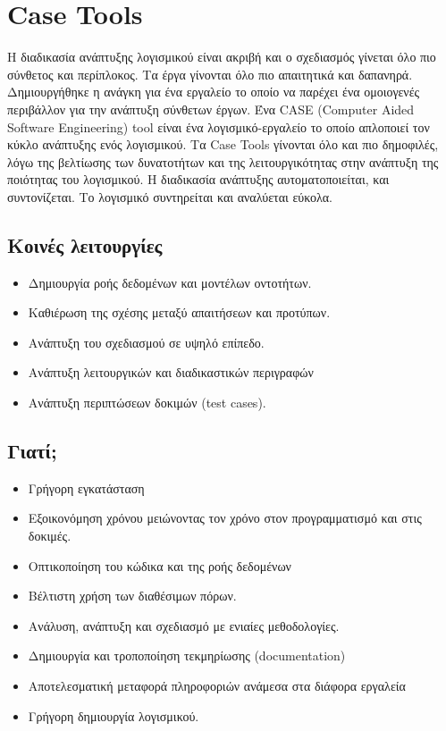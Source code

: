 \section{Case Tools}
Η διαδικασία ανάπτυξης λογισμικού είναι ακριβή και ο σχεδιασμός γίνεται όλο πιο σύνθετος και περίπλοκος. Τα έργα γίνονται όλο πιο απαιτητικά και δαπανηρά. Δημιουργήθηκε η ανάγκη για ένα εργαλείο το οποίο να παρέχει ένα ομοιογενές περιβάλλον για την ανάπτυξη σύνθετων έργων. 
Ένα CASE (Computer Aided Software Engineering) tool είναι ένα λογισμικό-εργαλείο το οποίο απλοποιεί τον κύκλο ανάπτυξης ενός λογισμικού. Τα Case Tools γίνονται όλο και πιο δημοφιλές, λόγω της βελτίωσης των δυνατοτήτων και της λειτουργικότητας στην ανάπτυξη της ποιότητας του λογισμικού. Η διαδικασία ανάπτυξης αυτοματοποιείται, και συντονίζεται. Το λογισμικό συντηρείται και αναλύεται εύκολα. 

\subsection{Kοινές λειτουργίες}
\begin{itemize}
	\item Δημιουργία ροής δεδομένων και μοντέλων οντοτήτων.
	\item Καθιέρωση της σχέσης μεταξύ απαιτήσεων και προτύπων.
	\item Ανάπτυξη του σχεδιασμού σε υψηλό επίπεδο.
	\item Ανάπτυξη λειτουργικών και διαδικαστικών περιγραφών
	\item Ανάπτυξη περιπτώσεων δοκιμών (test cases).	
\end{itemize}

\subsection{Γιατί;}
\begin{itemize}
	\item Γρήγορη εγκατάσταση
	\item Εξοικονόμηση χρόνου μειώνοντας τον χρόνο στον προγραμματισμό και στις δοκιμές.
	\item Οπτικοποίηση του κώδικα και της ροής δεδομένων
	\item Βέλτιστη χρήση των διαθέσιμων πόρων.
	\item Ανάλυση, ανάπτυξη και σχεδιασμό με ενιαίες μεθοδολογίες.
	\item Δημιουργία και τροποποίηση τεκμηρίωσης (documentation)
	\item Αποτελεσματική μεταφορά πληροφοριών ανάμεσα στα διάφορα εργαλεία
	\item Γρήγορη δημιουργία λογισμικού.
\end{itemize}

